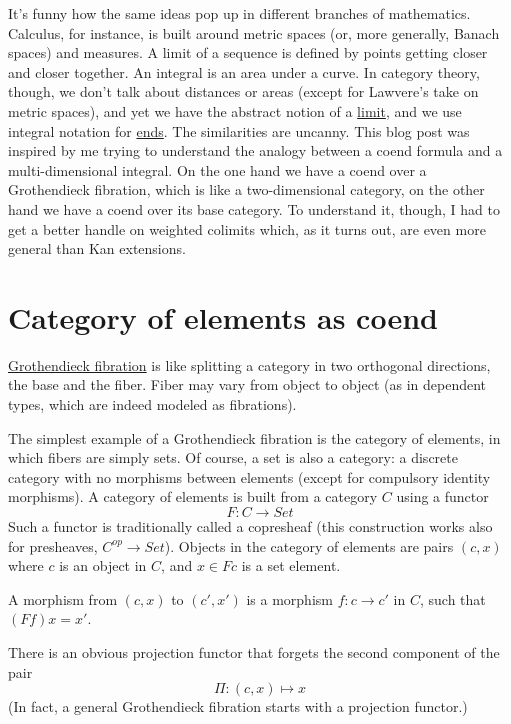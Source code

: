 \documentclass[11pt]{amsart}
\begin{document}
It's funny how the same ideas pop up in different branches of mathematics. Calculus, for instance, is built around metric spaces (or, more generally, Banach spaces) and measures. A limit of a sequence is defined by points getting closer and closer together. An integral is an area under a curve. In category theory, though, we don't talk about distances or areas (except for Lawvere's take on metric spaces), and yet we have the abstract notion of a \href{https://bartoszmilewski.com/2015/04/15/limits-and-colimits/}{limit}, and we use integral notation for \href{https://bartoszmilewski.com/2017/03/29/ends-and-coends/}{ends}. The similarities are uncanny. This blog post was inspired by me trying to understand the analogy between a coend formula and a multi-dimensional integral. On the one hand we have a coend over a Grothendieck fibration, which is like a two-dimensional category, on the other hand we have a coend over its base category. To understand it, though, I had to get a better handle on weighted colimits which, as it turns out, are even more general than Kan extensions. 

\section{Category of elements as coend}

\href{https://bartoszmilewski.com/2019/10/09/fibrations-cleavages-and-lenses/}{Grothendieck fibration} is like splitting a category in two orthogonal directions, the base and the fiber. Fiber may vary from object to object (as in dependent types, which are indeed modeled as fibrations). 

The simplest example of a Grothendieck fibration is the category of elements, in which fibers are simply sets. Of course, a set is also a category: a discrete category with no morphisms between elements (except for compulsory identity morphisms). A category of elements is built from a category $C$ using a functor
\[F \colon C \to Set\]
Such a functor is traditionally called a copresheaf (this construction works also for presheaves, $C^{op} \to Set$). Objects in the category of elements are pairs $(c, x)$ where $c$ is an object in $C$, and $x \in F c$ is a set element. 

A morphism from $(c, x)$ to $(c', x')$ is a morphism  $f \colon c \to c'$ in $C$, such that $(F f) x = x'$.

There is an obvious projection functor that forgets the second component of the pair
\[\Pi \colon (c, x) \mapsto x\]
(In fact, a general Grothendieck fibration starts with a projection functor.)
\end{document}

